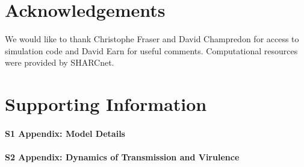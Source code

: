 \documentclass[10pt,letterpaper]{article}
\begin{document}
\section*{Acknowledgements}
We would like to thank Christophe Fraser and
David Champredon for access to simulation code
and David Earn for useful comments.
Computational resources were provided by SHARCnet.

\section*{Supporting Information}

\paragraph*{S1 Appendix: Model Details}
\label{S1_Appendix}

\paragraph*{S2 Appendix: Dynamics of Transmission and Virulence}
\label{S2_Appendix}

\clearpage

\nolinenumbers

% 
\end{document}
